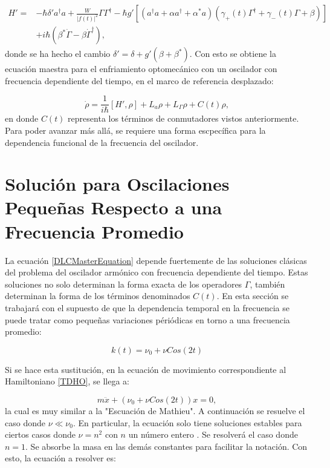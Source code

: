 \documentclass[a4paper,10pt]{report}
\begin{document}
\begin{align*}
H'=& -\hbar \delta' a^\dagger a + \frac{W}{|f(t)|^2}\Gamma \Gamma^\dagger -\hbar g'[(a^{\dagger}a +\alpha a^{\dagger}+\alpha^* a)(\gamma_+(t)\Gamma^{\dagger}+\gamma_-(t)\Gamma+\beta)]\\
&+ i\hbar(\beta^*\dot{\Gamma} - \beta \dot{\Gamma}^\dagger),
\end{align*}  donde se ha hecho el cambio $\delta' = \delta + g'(\beta + \beta^*)$. Con esto se obtiene la ecuación maestra para el enfriamiento optomecánico con un oscilador con frecuencia dependiente del tiempo, en el marco de referencia desplazado:

\begin{equation}\label{DLCMasterEquation}
\dot{\rho} = \frac{1}{i\hbar}[H',\rho] + L_a\rho + L_\Gamma\rho + C(t)\rho,
\end{equation} en donde $C(t)$ representa los términos de conmutadores vistos anteriormente. Para poder avanzar más allá, se requiere una forma escpecífica para la dependencia funcional de la frecuencia del oscilador.


\section{Solución para Oscilaciones Pequeñas Respecto a una Frecuencia Promedio}

La ecuación \ref{DLCMasterEquation} depende fuertemente de las soluciones clásicas del problema del oscilador armónico con frecuencia dependiente del tiempo. Estas soluciones no solo determinan la forma exacta de los operadores $\Gamma$, también determinan la forma de los términos denominados $C(t)$. En esta sección se trabajará con el supuesto de que la dependencia temporal en la frecuencia se puede tratar como pequeñas variaciones périódicas en torno a una frecuencia promedio:

\begin{equation}
k(t) = \nu_0 + \nu Cos(2t)
\end{equation}

Si se hace esta sustitución, en la ecuación de movimiento correspondiente al Hamiltoniano \ref{TDHO}, se llega a:

\begin{equation}
m\ddot{x} + (\nu_0 + \nu Cos(2t))x = 0,
\end{equation} la cual es muy similar a la "Escuación de Mathieu". A continuación se resuelve el caso donde $\nu \ll \nu_0$. En particular, la ecuación solo tiene soluciones estables para ciertos casos donde $\nu = n^2$ con $n$ un número entero \cite{WardFT}. Se resolverá el caso donde $n = 1$. Se absorbe la masa en las demás constantes para facilitar la notación. Con esto, la ecuación a resolver es:
\end{document}
